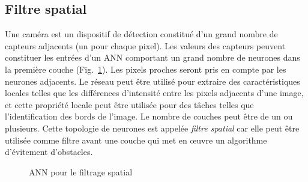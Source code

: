 \subsection{Filtre spatial}

Une caméra est un dispositif de détection constitué d'un grand nombre de capteurs adjacents (un pour chaque pixel). Les valeurs des capteurs peuvent constituer les entrées d'un ANN comportant un grand nombre de neurones dans la première couche (Fig.~\ref{fig.ann-spatial-filtering}). Les pixels proches seront pris en compte par les neurones adjacents. Le réseau peut être utilisé pour extraire des caractéristiques locales telles que les différences d'intensité entre les pixels adjacents d'une image, et cette propriété locale peut être utilisée pour des tâches telles que l'identification des bords de l'image. Le nombre de couches peut être de un ou plusieurs. Cette topologie de neurones est appelée \emph{filtre spatial} car elle peut être utilisée comme filtre avant une couche qui met en œuvre un algorithme d'évitement d'obstacles.

\begin{figure}
\begin{center}
\caption{ANN pour le filtrage spatial}
\label{fig.ann-spatial-filtering}
\end{center}
\end{figure}

